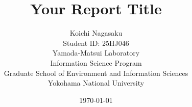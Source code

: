 \documentclass[dvipdfmx]{article}
\title{Your Report Title}
\author{Koichi Nagasaku \\
        Student ID: 25HJ046 \\
        Yamada-Matsui Laboratory \\
        Information Science Program \\
        Graduate School of Environment and Information Sciences \\
        Yokohama National University}
\date{\today}
\begin{document}
\maketitle

\begin{abstract}
\end{abstract}

\tableofcontents
\listoffigures
\listoftables
\newpage


%
% 
% 
% 
% 
%


\appendix




\end{document}
